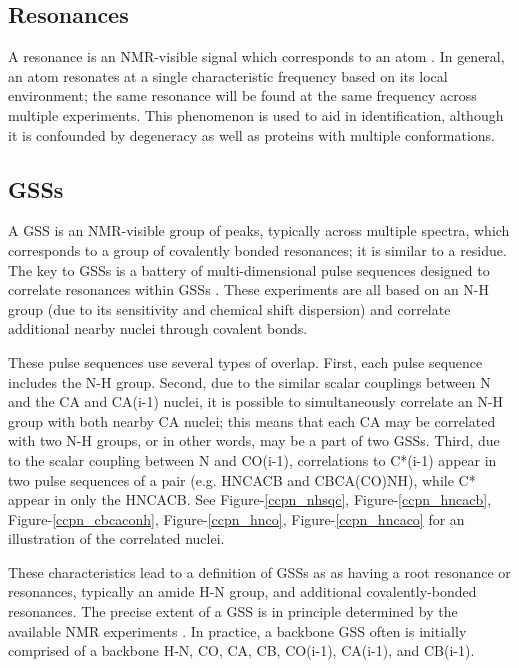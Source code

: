 \subsection{Resonances}
A resonance is an NMR-visible signal which corresponds to an atom \cite{ccpn}.
In general, an atom resonates at a single characteristic frequency based
on its local environment;  the same resonance will be found at the same 
frequency across multiple experiments.  This phenomenon is used to aid in 
identification, although it is confounded by degeneracy as well as proteins
with multiple conformations.

\subsection{GSSs}
A GSS is an NMR-visible group of peaks, typically across multiple spectra,
which corresponds to a group of covalently bonded resonances; it is similar
to a residue.  
The key to GSSs is a battery of multi-dimensional pulse 
sequences designed to correlate resonances within GSSs 
\cite{cavanagh1995protein, hncacb, hnco, cbcaconh}.  These experiments are all
based on an N-H group (due to its sensitivity and chemical shift dispersion)
and correlate additional nearby nuclei through covalent bonds.

These pulse sequences use several types of overlap.  First, each pulse sequence
includes the N-H group.  Second, due to the similar scalar couplings between
N and the CA and CA(i-1) nuclei, it is possible to simultaneously correlate an
N-H group with both nearby CA nuclei; this means that each CA may be correlated
with two N-H groups, or in other words, may be a part of two GSSs. 
Third, due to the scalar coupling between N and CO(i-1), correlations to 
C*(i-1) appear in two pulse sequences of a pair (e.g. HNCACB and CBCA(CO)NH), 
while C* appear in only the HNCACB.  See Figure-\ref{ccpn_nhsqc}, 
Figure-\ref{ccpn_hncacb}, Figure-\ref{ccpn_cbcaconh}, Figure-\ref{ccpn_hnco}, 
Figure-\ref{ccpn_hncaco} for an illustration of the correlated nuclei.

These characteristics lead to a definition of GSSs as as having a root 
resonance or resonances, typically an amide H-N group, and additional 
covalently-bonded resonances.  The precise extent of a GSS is in principle 
determined by the available NMR experiments \cite{hncacb, hnco, cbcaconh}.  
In practice, a backbone GSS often is initially 
comprised of a backbone H-N, CO, CA, CB, CO(i-1), CA(i-1), and CB(i-1).  


